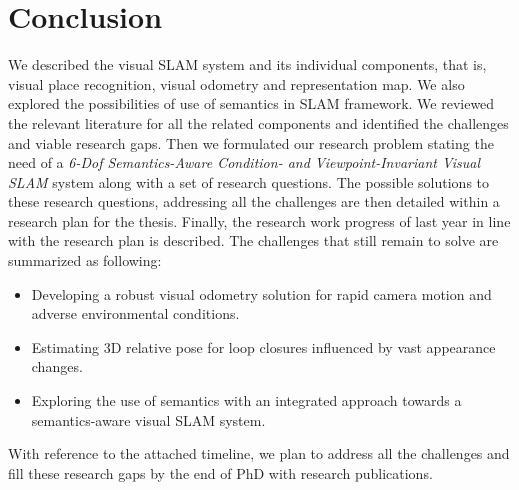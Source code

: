 \documentclass{article}
\begin{document}
\section{Conclusion}
We described the visual SLAM system and its individual components, that is, visual place recognition, visual odometry and representation map. We also explored the possibilities of use of semantics in SLAM framework. We reviewed the relevant literature for all the related components and identified the challenges and viable research gaps. Then we formulated our research problem stating the need of a \emph{6-Dof Semantics-Aware Condition- and Viewpoint-Invariant Visual SLAM} system along with a set of research questions. The possible solutions to these research questions, addressing all the challenges are then detailed within a research plan for the thesis. Finally, the research work progress of last year in line with the research plan is described. The challenges that still remain to solve are summarized as following:
\begin{itemize}
 \item Developing a robust visual odometry solution for rapid camera motion and adverse environmental conditions.
 \item Estimating 3D relative pose for loop closures influenced by vast appearance changes.
 \item Exploring the use of semantics with an integrated approach towards a semantics-aware visual SLAM system.
\end{itemize}
With reference to the attached timeline, we plan to address all the challenges and fill these research gaps by the end of PhD with research publications.


\clearpage



\end{document}
